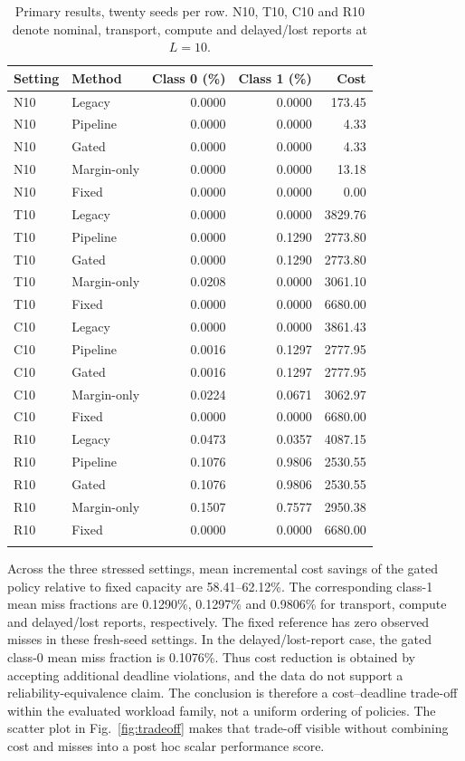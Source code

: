 \documentclass[10pt,a4paper]{article}
\begin{document}
\begin{table}[htbp]\centering\small
\caption{Primary results, twenty seeds per row. N10, T10, C10 and R10 denote nominal, transport, compute and delayed/lost reports at $L=10$.}
\begin{tabular}{llrrr}\toprule
Setting & Method & Class 0 (\%) & Class 1 (\%) & Cost\\\midrule
N10 & Legacy & 0.0000 & 0.0000 & 173.45 \\
N10 & Pipeline & 0.0000 & 0.0000 & 4.33 \\
N10 & Gated & 0.0000 & 0.0000 & 4.33 \\
N10 & Margin-only & 0.0000 & 0.0000 & 13.18 \\
N10 & Fixed & 0.0000 & 0.0000 & 0.00 \\
\addlinespace
T10 & Legacy & 0.0000 & 0.0000 & 3829.76 \\
T10 & Pipeline & 0.0000 & 0.1290 & 2773.80 \\
T10 & Gated & 0.0000 & 0.1290 & 2773.80 \\
T10 & Margin-only & 0.0208 & 0.0000 & 3061.10 \\
T10 & Fixed & 0.0000 & 0.0000 & 6680.00 \\
\addlinespace
C10 & Legacy & 0.0000 & 0.0000 & 3861.43 \\
C10 & Pipeline & 0.0016 & 0.1297 & 2777.95 \\
C10 & Gated & 0.0016 & 0.1297 & 2777.95 \\
C10 & Margin-only & 0.0224 & 0.0671 & 3062.97 \\
C10 & Fixed & 0.0000 & 0.0000 & 6680.00 \\
\addlinespace
R10 & Legacy & 0.0473 & 0.0357 & 4087.15 \\
R10 & Pipeline & 0.1076 & 0.9806 & 2530.55 \\
R10 & Gated & 0.1076 & 0.9806 & 2530.55 \\
R10 & Margin-only & 0.1507 & 0.7577 & 2950.38 \\
R10 & Fixed & 0.0000 & 0.0000 & 6680.00 \\
\addlinespace
\bottomrule\end{tabular}\label{tab:primary}
\end{table}

Across the three stressed settings, mean incremental cost savings of the gated
policy relative to fixed capacity are 58.41--62.12\%.
The corresponding class-1 mean miss fractions are 0.1290\%, 0.1297\% and 0.9806\% for transport, compute and delayed/lost reports, respectively. The fixed reference has zero observed misses in these fresh-seed settings. In the delayed/lost-report case, the gated class-0 mean miss fraction is 0.1076\%. Thus cost reduction is obtained by accepting additional deadline violations, and the data do not support a reliability-equivalence claim. The conclusion is therefore a cost--deadline trade-off
within the evaluated workload family, not a uniform ordering of policies.
The scatter plot in Fig.~\ref{fig:tradeoff} makes that trade-off visible without
combining cost and misses into a post hoc scalar performance score.
\end{document}
